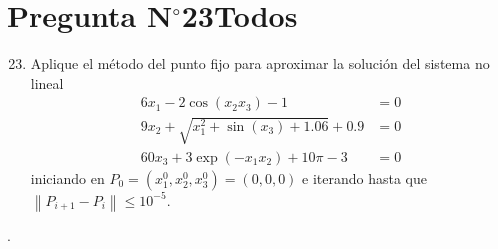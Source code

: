 \section{Pregunta N$^{\circ}$23\qquad Todos}

\begin{frame}
	\begin{enumerate}\setcounter{enumi}{22}
		\item

		      Aplique el método del punto fijo para aproximar la solución
		      del sistema no lineal
		      \begin{align*}
			      6x_{1}-2\cos\left(x_{2}x_{3}\right)-1                   & =0 \\
			      9x_{2}+\sqrt{x^{2}_{1}+\sin\left(x_{3}\right)+1.06}+0.9 & =0 \\
			      60x_{3}+3\exp\left(-x_{1}x_{2}\right)+10 \pi-3          & =0
		      \end{align*}
		      iniciando en
		      \begin{math}
			      P_{0}=
			      \left(
			      x^{0}_{1},x^{0}_{2},x^{0}_{3}
			      \right)=
			      \left(
			      0,0,0
			      \right)
		      \end{math}
		      e iterando hasta que
		      \begin{math}
			      \left\|
			      P_{i+1}-
			      P_{i}\right\|
			      \leq 10^{-5}
		      \end{math}.
	\end{enumerate}

	\begin{solution}
		.
	\end{solution}
\end{frame}